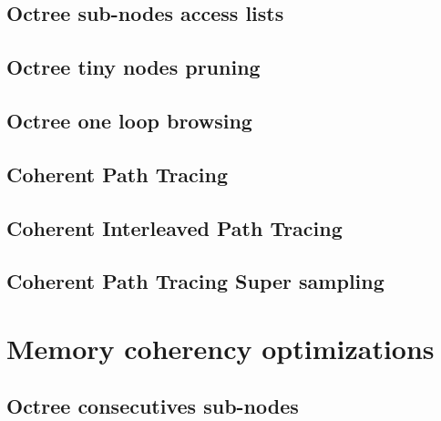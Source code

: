 \documentclass[11pt,twocolumn,a4paper]{article}
\begin{document}
\subsection{Octree sub-nodes access lists}
\subsection{Octree tiny nodes pruning}
\subsection{Octree one loop browsing}
\subsection{Coherent Path Tracing}
\subsection{Coherent Interleaved Path Tracing}
\subsection{Coherent Path Tracing Super sampling}

\section{Memory coherency optimizations}
\subsection{Octree consecutives sub-nodes}


\end{document}
